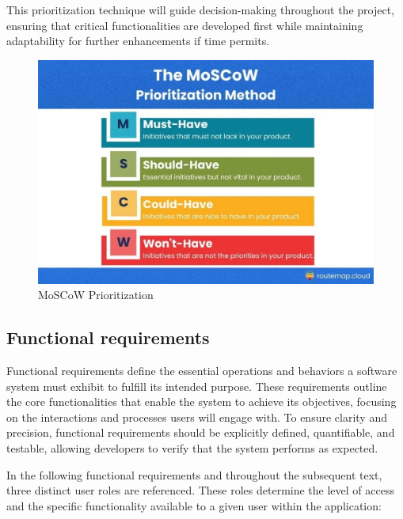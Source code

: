 This prioritization technique will guide decision-making throughout the project, ensuring that critical functionalities are developed first while maintaining adaptability for further enhancements if time permits.

\begin{figure}[!htbp]
  \centering
  \includegraphics[width=\linewidth]{images/moscow}
  \caption{MoSCoW Prioritization~\cite{MoSCoW}}
  \label{fig:MoSCoW}
\end{figure}

\subsection{Functional requirements}

Functional requirements define the essential operations and behaviors a software system must exhibit to fulfill its intended purpose. These requirements outline the core functionalities that enable the system to achieve its objectives, focusing on the interactions and processes users will engage with. To ensure clarity and precision, functional requirements should be explicitly defined, quantifiable, and testable, allowing developers to verify that the system performs as expected.

In the following functional requirements and throughout the subsequent text, three distinct user roles are referenced. These roles determine the level of access and the specific functionality available to a given user within the application:


